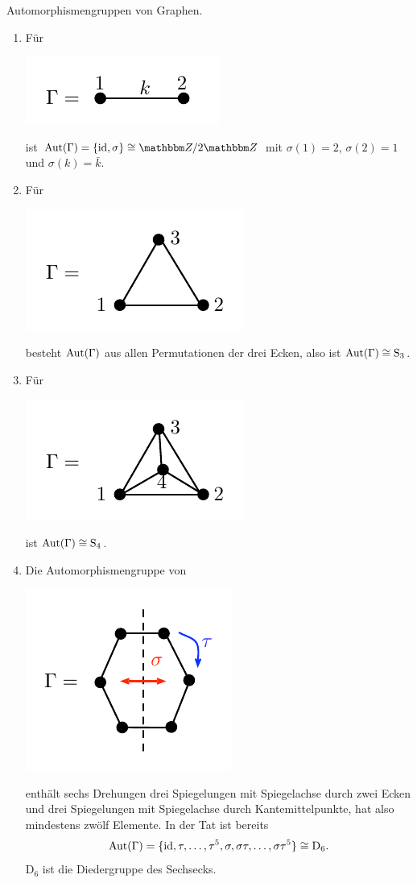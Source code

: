 \documentclass[a4paper, 12pt, twoside]{article}
\begin{document}
\BSP Automorphismengruppen von Graphen.
\begin{enumerate}
\item Für
\begin{center}
	\includegraphics{grugraImages/aut1}
\end{center}
ist $\Aut(\GR)=\{\id,\sigma\}\cong \ZZ/2\ZZ$ mit
$\sigma(1)=2$, $\sigma(2)=1$ und $\sigma(k)=\bar{k}$.
\item Für
\begin{center}
	\includegraphics{grugraImages/aut2}
\end{center}
besteht $\mathrm{Aut}(\Gamma)$ aus allen Permutationen der drei Ecken,
also ist $\mathrm{Aut}(\Gamma)\cong \mathrm{S}_3$.
\item Für
\begin{center}
	\includegraphics{grugraImages/aut3}
\end{center}
ist $\mathrm{Aut}(\Gamma)\cong \mathrm{S}_4$.
\item Die Automorphismengruppe von
\begin{center}
	\includegraphics{grugraImages/aut4}
\end{center}
enthält sechs Drehungen drei Spiegelungen mit Spiegelachse
durch zwei Ecken und drei Spiegelungen mit Spiegelachse durch
Kantemittelpunkte, hat also mindestens zwölf Elemente.
In der Tat ist bereits
\[
\mathrm{Aut}(\Gamma) = \{\mathrm{id},\tau,\ldots,\tau^5,
	\sigma,\sigma\tau,\ldots,\sigma \tau^5 \}
\cong \mathrm{D}_6.
\]
$\mathrm{D}_6$ ist die Diedergruppe des Sechsecks.
\end{enumerate}
\end{document}
